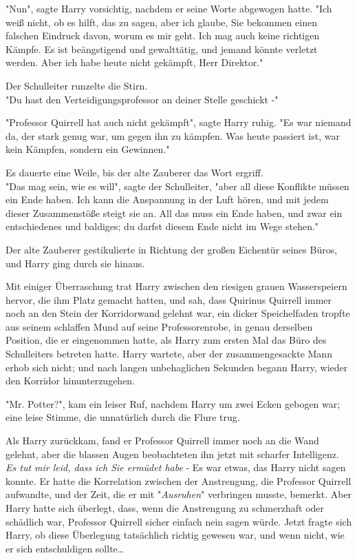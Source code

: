 {"Nun", sagte Harry vorsichtig, nachdem er seine Worte abgewogen hatte. "Ich weiß nicht, ob es hilft, das zu sagen, aber ich glaube, Sie bekommen einen falschen Eindruck davon, worum es mir geht. Ich mag auch keine richtigen Kämpfe. Es ist beängstigend und gewalttätig, und jemand könnte verletzt werden. Aber ich habe heute nicht gekämpft, Herr Direktor."

Der Schulleiter runzelte die Stirn.\\ "Du hast den Verteidigungsprofessor an deiner Stelle geschickt -"

"Professor Quirrell hat auch nicht gekämpft", sagte Harry ruhig. "Es war niemand da, der stark genug war, um gegen ihn zu kämpfen. Was heute passiert ist, war kein Kämpfen, sondern ein Gewinnen."

Es dauerte eine Weile, bis der alte Zauberer das Wort ergriff.\\ "Das mag sein, wie es will", sagte der Schulleiter, "aber all diese Konflikte müssen ein Ende haben. Ich kann die Anspannung in der Luft hören, und mit jedem dieser Zusammenstöße steigt sie an. All das muss ein Ende haben, und zwar ein entschiedenes und baldiges; du darfst diesem Ende nicht im Wege stehen."

Der alte Zauberer gestikulierte in Richtung der großen Eichentür seines Büros, und Harry ging durch sie hinaus.

Mit einiger Überraschung trat Harry zwischen den riesigen grauen Wasserspeiern hervor, die ihm Platz gemacht hatten, und sah, dass Quirinus Quirrell immer noch an den Stein der Korridorwand gelehnt war, ein dicker Speichelfaden tropfte aus seinem schlaffen Mund auf seine Professorenrobe, in genau derselben Position, die er eingenommen hatte, als Harry zum ersten Mal das Büro des Schulleiters betreten hatte. Harry wartete, aber der zusammengesackte Mann erhob sich nicht; und nach langen unbehaglichen Sekunden begann Harry, wieder den Korridor hinunterzugehen.

"Mr. Potter?", kam ein leiser Ruf, nachdem Harry um zwei Ecken gebogen war; eine leise Stimme, die unnatürlich durch die Flure trug.

Als Harry zurückkam, fand er Professor Quirrell immer noch an die Wand gelehnt, aber die blassen Augen beobachteten ihn jetzt mit scharfer Intelligenz.\\ \emph{Es tut mir leid, dass ich Sie ermüdet habe} - Es war etwas, das Harry nicht sagen konnte. Er hatte die Korrelation zwischen der Anstrengung, die Professor Quirrell aufwandte, und der Zeit, die er mit "\emph{Ausruhen}" verbringen musste, bemerkt. Aber Harry hatte sich überlegt, dass, wenn die Anstrengung zu schmerzhaft oder schädlich war, Professor Quirrell sicher einfach nein sagen würde. Jetzt fragte sich Harry, ob diese Überlegung tatsächlich richtig gewesen war, und wenn nicht, wie er sich entschuldigen sollte…

}
